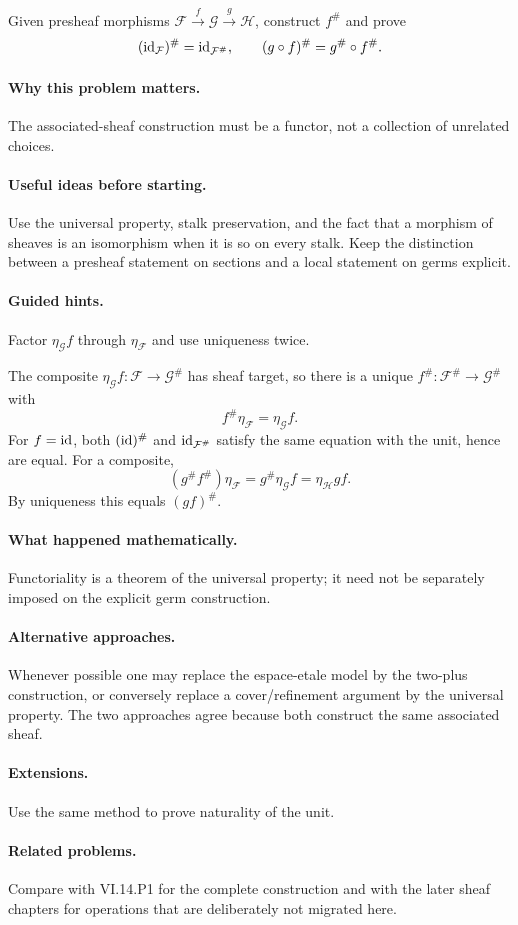 \begin{problem}
Given presheaf morphisms $\mathcal F\xrightarrow f\mathcal G\xrightarrow g\mathcal H$, construct $f^\#$ and prove
\[
(\operatorname{id}_{\mathcal F})^\#=\operatorname{id}_{\mathcal F^\#},\qquad (g\circ f)^\#=g^\#\circ f^\#.
\]
\end{problem}

\paragraph{Why this problem matters.}
The associated-sheaf construction must be a functor, not a collection of unrelated choices.

\paragraph{Useful ideas before starting.}
Use the universal property, stalk preservation, and the fact that a morphism of sheaves is an isomorphism when it is so on every stalk.  Keep the distinction between a presheaf statement on sections and a local statement on germs explicit.

\paragraph{Guided hints.}
Factor $\eta_{\mathcal G}f$ through $\eta_{\mathcal F}$ and use uniqueness twice.

\ifdefined\FullProblemDossiers
\begin{solution}
The composite $\eta_{\mathcal G}f:\mathcal F\to\mathcal G^\#$ has sheaf target, so there is a unique $f^\#: \mathcal F^\#\to\mathcal G^\#$ with
\[
f^\#\eta_{\mathcal F}=\eta_{\mathcal G}f.
\]
For $f=\operatorname{id}$, both $(\operatorname{id})^\#$ and $\operatorname{id}_{\mathcal F^\#}$ satisfy the same equation with the unit, hence are equal. For a composite,
\[
(g^\#f^\#)\eta_{\mathcal F}=g^\#\eta_{\mathcal G}f=\eta_{\mathcal H}gf.
\]
By uniqueness this equals $(gf)^\#$.
\end{solution}

\paragraph{What happened mathematically.}
Functoriality is a theorem of the universal property; it need not be separately imposed on the explicit germ construction.

\paragraph{Alternative approaches.}
Whenever possible one may replace the espace-etale model by the two-plus construction, or conversely replace a cover/refinement argument by the universal property.  The two approaches agree because both construct the same associated sheaf.

\paragraph{Extensions.}
Use the same method to prove naturality of the unit.

\paragraph{Related problems.}
Compare with VI.14.P1 for the complete construction and with the later sheaf chapters for operations that are deliberately not migrated here.
\fi
